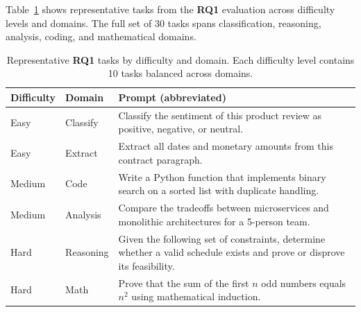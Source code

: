 \documentclass[11pt,a4paper]{article}
\newcommand{\RQ}[1]{\textbf{RQ#1}}
\begin{document}
Table~\ref{tab:rq1-tasks} shows representative tasks from the \RQ{1} evaluation across difficulty levels and domains. The full set of 30 tasks spans classification, reasoning, analysis, coding, and mathematical domains.

\begin{table}[h]
\centering
\caption{Representative \RQ{1} tasks by difficulty and domain. Each difficulty level contains 10 tasks balanced across domains.}
\label{tab:rq1-tasks}
\begin{tabular}{p{1.2cm}p{1.5cm}p{8cm}}
\toprule
Difficulty & Domain & Prompt (abbreviated) \\
\midrule
Easy & Classify & Classify the sentiment of this product review as positive, negative, or neutral. \\
\addlinespace
Easy & Extract & Extract all dates and monetary amounts from this contract paragraph. \\
\addlinespace
Medium & Code & Write a Python function that implements binary search on a sorted list with duplicate handling. \\
\addlinespace
Medium & Analysis & Compare the tradeoffs between microservices and monolithic architectures for a 5-person team. \\
\addlinespace
Hard & Reasoning & Given the following set of constraints, determine whether a valid schedule exists and prove or disprove its feasibility. \\
\addlinespace
Hard & Math & Prove that the sum of the first $n$ odd numbers equals $n^2$ using mathematical induction. \\
\bottomrule
\end{tabular}
\end{table}
\end{document}
